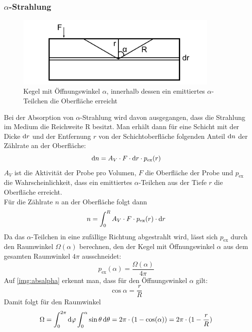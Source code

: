 \subsubsection{$\alpha$-Strahlung}
\begin{figure}[H]
\begin{center}
  \includegraphics[width=10cm]{../img/absalpha}
  \caption{Kegel mit Öffnungswinkel $\alpha$,
  innerhalb dessen ein emittiertes $\alpha$-Teilchen die Oberfläche erreicht}
  \label{img:absalpha}
\end{center}
\end{figure}
Bei der Absorption von $\alpha$-Strahlung wird davon ausgegangen, dass die Strahlung im Medium
die Reichweite R besitzt.
Man erhält dann für eine Schicht mit der Dicke $\mathrm{d} r$ und der Entfernung $r$ von der Schichtoberfläche
folgenden Anteil $\mathrm{d} n$ der Zählrate an der Oberfläche:
\begin{equation}
  \mathrm{d} n=A_V \cdot F \cdot \mathrm{d} r \cdot p_{\text{ex}}(r)
\end{equation}
$A_V$ ist die Aktivität der Probe pro Volumen, $F$ die Oberfläche der Probe und $p_{\text{ex}}$
die Wahrscheinlichkeit, dass ein emittiertes $\alpha$-Teilchen aus der Tiefe $r$ die Oberfläche erreicht.\\
Für die Zählrate $n$ an der Oberfläche folgt dann
\begin{equation}
  n=\int_{0}^{R}{A_V \cdot F \cdot p_{\text{ex}}(r) \cdot \mathrm{d} r}
\end{equation}
Da das $\alpha$-Teilchen in eine zufällige Richtung abgestrahlt wird,
lässt sich $p_{\text{ex}}$ durch den Raumwinkel $\Omega(\alpha)$ berechnen,
den der Kegel mit Öffnungswinkel $\alpha$
aus dem gesamten Raumwinkel $4\pi$ ausschneidet:
\begin{equation}
  p_{\text{ex}}(\alpha)=\frac{\Omega(\alpha)}{4\pi}
\end{equation}
Auf \autoref{img:absalpha} erkennt man,
dass für den Öffnungswinkel $\alpha$ gilt:
\begin{equation}
  \cos \alpha = \frac{r}{R}
\end{equation}
Damit folgt für den Raumwinkel
\begin{equation}
  \Omega= \int_{0}^{2 \pi} \mathrm{d} \varphi \int_{0}^{\alpha} \sin \theta \, \mathrm{d} \theta= 2\pi \cdot (1-\cos(\alpha))=2\pi \cdot (1-\frac{r}{R})
\end{equation}
